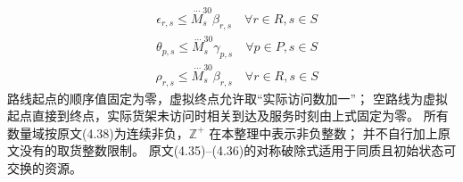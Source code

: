 \documentclass[UTF8,11pt]{ctexart}
\begin{document}
\[\begin{aligned}& \epsilon_{r, s} \le \overset{\cdots}{M}^{30}_s \beta_{r, s} \quad \forall r \in R, s \in S\end{aligned}\]
\[\begin{aligned}& \theta_{p, s} \le \overset{\cdots}{M}^{30}_s \gamma_{p, s} \quad \forall p \in P, s \in S\end{aligned}\]
\[\begin{aligned}& \rho_{r, s} \le \overset{\cdots}{M}^{30}_s \beta_{r, s} \quad \forall r \in R, s \in S\end{aligned}\]
路线起点的顺序值固定为零，虚拟终点允许取“实际访问数加一”；
空路线为虚拟起点直接到终点，实际货架未访问时相关到达及服务时刻由上式固定为零。
所有数量域按原文(4.38)为连续非负，$\mathbb Z^+$ 在本整理中表示非负整数；
并不自行加上原文没有的取货整数限制。
原文(4.35)--(4.36)的对称破除式适用于同质且初始状态可交换的资源。
\end{document}
